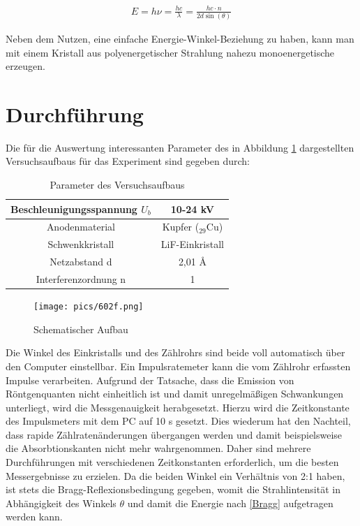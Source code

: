 \begin{align}
E = h\nu = \frac{h c}{\lambda} = \frac{h c\cdot n}{2d\sin(\theta)}
\label{Bragg}
\end{align}

Neben dem Nutzen, eine einfache Energie-Winkel-Beziehung zu haben, kann man mit einem Kristall aus polyenergetischer
Strahlung nahezu monoenergetische erzeugen.

\section{Durchführung}
Die für die Auswertung interessanten Parameter des in Abbildung \ref{Aufbau} dargestellten Versuchsaufbaus für das Experiment
sind gegeben durch:

\renewcommand{\arraystretch}{1.5}
\begin{table}[H]
 \begin{tabular}{|c|c|}
\hline
Beschleunigungsspannung $U_b$ & 10-24 kV\\
\hline
Anodenmaterial & Kupfer ($_{29}$Cu)\\
\hline
Schwenkkristall & LiF-Einkristall\\
\hline
Netzabstand d  & 2,01 \AA \\
\hline
Interferenzordnung n & 1\\
\hline
\end{tabular}
\caption{Parameter des Versuchsaufbaus}
\end{table}
\renewcommand{\arraystretch}{1}

\begin{figure}[H]
\texttt{[image: pics/602f.png]}
\centering
\caption{Schematischer Aufbau}
\label{Aufbau}
\end{figure}


Die Winkel des Einkristalls und des Zählrohrs sind beide voll automatisch über den Computer einstellbar. Ein Impulsratemeter
kann die vom Zählrohr erfassten Impulse verarbeiten. Aufgrund der Tatsache, dass die Emission von Röntgenquanten nicht
einheitlich ist und damit unregelmäßigen Schwankungen unterliegt, wird die Messgenauigkeit herabgesetzt. Hierzu wird die
Zeitkonstante des Impulsmeters mit dem PC auf 10 s gesetzt. Dies wiederum hat den Nachteil, dass rapide Zählratenänderungen
übergangen werden und damit beispielsweise die Absorbtionskanten nicht mehr wahrgenommen. Daher sind mehrere Durchführungen
mit verschiedenen Zeitkonstanten erforderlich, um die besten Messergebnisse zu erzielen. Da die beiden Winkel ein Verhältnis
von 2:1 haben, ist stets die Bragg-Reflexionsbedingung gegeben, womit die Strahlintensität in Abhängigkeit des Winkels
$\theta$ und damit die Energie nach \eqref{Bragg} aufgetragen werden kann. 

